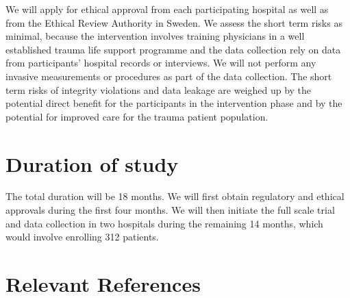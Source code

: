 \documentclass[
  11pt,
]{article}
\begin{document}
We will apply for ethical approval from each participating hospital as well as from the Ethical Review Authority in Sweden. We assess the short term risks as minimal, because the intervention involves training physicians in a well established trauma life support programme and the data collection rely on data from participants' hospital records or interviews. We will not perform any invasive measurements or procedures as part of the data collection. The short term risks of integrity violations and data leakage are weighed up by the potential direct benefit for the participants in the intervention phase and by the potential for improved care for the trauma patient population.

\hypertarget{duration-of-study}{%
\section{Duration of study}\label{duration-of-study}}

The total duration will be 18 months. We will first obtain regulatory and ethical approvals during the first four months. We will then initiate the full scale trial and data collection in two hospitals during the remaining 14 months, which would involve enrolling 312 patients.

\hypertarget{relevant-references}{%
\section*{Relevant References}\label{relevant-references}}
\end{document}
